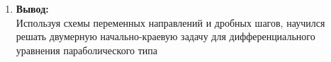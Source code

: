 \documentclass[12pt]{article}
\begin{document}
\begin{enumerate}
        
        \item \textbf{Вывод:}\\
        Используя схемы переменных направлений и дробных шагов, научился
        решать двумерную начально-краевую задачу для дифференциального 
        уравнения параболического типа
    \end{enumerate}
\end{document}
